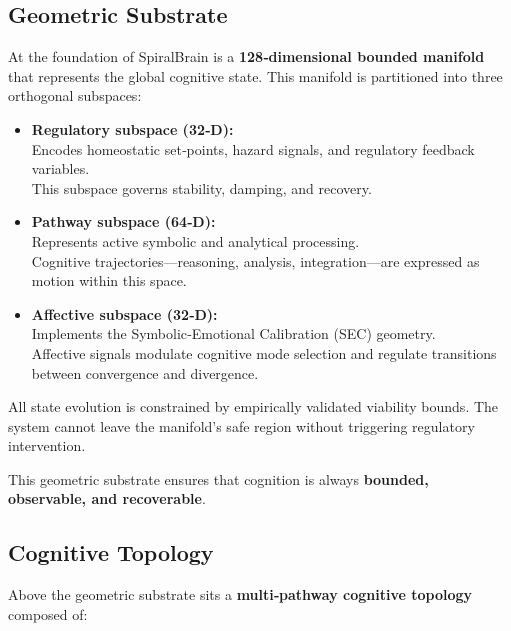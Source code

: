 \documentclass[12pt,a4paper]{report}
\begin{document}
\subsection{Geometric Substrate}

At the foundation of SpiralBrain \cite{SpiralBrainV3} is a \textbf{128‑dimensional bounded manifold} \cite{Rabinovich2006} that represents the global cognitive state. This manifold is partitioned into three orthogonal subspaces:

\begin{itemize}
\item \textbf{Regulatory subspace (32‑D):} \\
  Encodes homeostatic set‑points, hazard signals, and regulatory feedback variables. \\
  This subspace governs stability, damping, and recovery.

\item \textbf{Pathway subspace (64‑D):} \\
  Represents active symbolic and analytical processing. \\
  Cognitive trajectories—reasoning, analysis, integration—are expressed as motion within this space.

\item \textbf{Affective subspace (32‑D):} \\
  Implements the Symbolic‑Emotional Calibration (SEC) geometry. \\
  Affective signals modulate cognitive mode selection and regulate transitions between convergence and divergence.
\end{itemize}

All state evolution is constrained by empirically validated viability bounds. The system cannot leave the manifold’s safe region without triggering regulatory intervention.

This geometric substrate ensures that cognition is always \textbf{bounded, observable, and recoverable}.

\subsection{Cognitive Topology}

Above the geometric substrate sits a \textbf{multi‑pathway cognitive topology} composed of:
\end{document}
